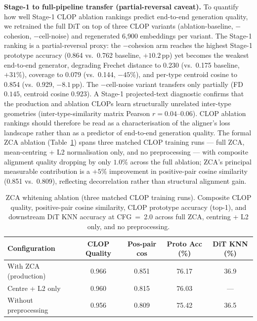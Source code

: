 \documentclass[11pt,a4paper]{article}
\begin{document}
\textbf{Stage-1 to full-pipeline transfer (partial-reversal caveat).} To quantify how well Stage-1 CLOP ablation rankings predict end-to-end generation quality, we retrained the full DiT on top of three CLOP variants (ablation-baseline, $-$cohesion, $-$cell-noise) and regenerated 6{,}900 embeddings per variant. The Stage-1 ranking is a partial-reversal proxy: the $-$cohesion arm reaches the highest Stage-1 prototype accuracy (0.864 vs.\ 0.762 baseline, $+10.2$\,pp) yet becomes the weakest end-to-end generator, degrading Frechet distance to 0.230 (vs.\ 0.175 baseline, $+31\%$), coverage to 0.079 (vs.\ 0.144, $-45\%$), and per-type centroid cosine to 0.854 (vs.\ 0.929, $-8.1$\,pp). The $-$cell-noise variant transfers only partially (FD $0.145$, centroid cosine $0.923$). A Stage-1 projected-text diagnostic confirms that the production and ablation CLOPs learn structurally unrelated inter-type geometries (inter-type-similarity matrix Pearson $r = 0.04$--$0.06$). CLOP ablation rankings should therefore be read as a characterisation of the aligner's loss landscape rather than as a predictor of end-to-end generation quality. The formal ZCA ablation (Table~\ref{tab:zca-ablation}) spans three matched CLOP training runs --- full ZCA, mean-centring + L2 normalisation only, and no preprocessing --- with composite alignment quality dropping by only $1.0\%$ across the full ablation; ZCA's principal measurable contribution is a $+5\%$ improvement in positive-pair cosine similarity (0.851 vs.\ 0.809), reflecting decorrelation rather than structural alignment gain.

\begin{table}[!htbp]
\caption{ZCA whitening ablation (three matched CLOP training runs). Composite CLOP quality, positive-pair cosine similarity, CLOP prototype accuracy (top-1), and downstream DiT KNN accuracy at CFG~=~2.0 across full ZCA, centring + L2 only, and no preprocessing.\label{tab:zca-ablation}}
\centering
\small
\begin{tabular}{lcccc}
\toprule
\textbf{Configuration} & \textbf{CLOP Quality} & \textbf{Pos-pair cos} & \textbf{Proto Acc (\%)} & \textbf{DiT KNN (\%)} \\
\midrule
With ZCA (production) & 0.966 & 0.851 & 76.17 & 36.9 \\
Centre + L2 only & 0.960 & 0.815 & 76.03 & --- \\
Without preprocessing & 0.956 & 0.809 & 75.42 & 36.5 \\
\bottomrule
\end{tabular}
\end{table}
\end{document}
